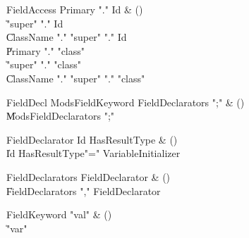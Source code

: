 \begin{bbgrammar}

FieldAccess \label{prod:FieldAccess}  \: Primary \xcd"." Id & () \\

    \| \xcd"super" \xcd"." Id \\
    \| ClassName \xcd"." \xcd"super"  \xcd"." Id \\
    \| Primary \xcd"." \xcd"class"  \\
    \| \xcd"super" \xcd"." \xcd"class"  \\
    \| ClassName \xcd"." \xcd"super"  \xcd"." \xcd"class"  \\

\end{bbgrammar}

\begin{bbgrammar}

FieldDecl \label{prod:FieldDecl}  \: Mods\opt FieldKeyword FieldDeclarators \xcd";" & () \\

    \| Mods\opt FieldDeclarators \xcd";" \\

\end{bbgrammar}

\begin{bbgrammar}

FieldDeclarator \label{prod:FieldDeclarator}  \: Id HasResultType & () \\

    \| Id HasResultType\opt \xcd"=" VariableInitializer \\

\end{bbgrammar}

\begin{bbgrammar}

FieldDeclarators \label{prod:FieldDeclarators}  \: FieldDeclarator & () \\

    \| FieldDeclarators \xcd"," FieldDeclarator \\

\end{bbgrammar}

\begin{bbgrammar}

FieldKeyword \label{prod:FieldKeyword}  \: \xcd"val" & () \\

    \| \xcd"var" \\

\end{bbgrammar}

